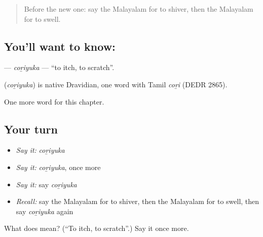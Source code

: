 \label{lesson:ML-C304-coriyuka}



\begin{quote}
Before the new one: say the Malayalam for to shiver, then the Malayalam for to swell.
\end{quote}

\subsection*{You'll want to know: }
\textbf{} — \emph{coṟiyuka} — \textquotedblleft{}to itch, to scratch\textquotedblright{}.

\begin{cousinweb}
\textbf{} (\emph{coṟiyuka}) is native Dravidian, one word with Tamil \emph{coṟi} (DEDR 2865).
\end{cousinweb}

\begin{grammarlens}[title={What you've built}]
One more word for this chapter.
\end{grammarlens}

\subsection*{Your turn}
\begin{itemize}
\raggedright
  \item \emph{Say it:} \emph{coṟiyuka}
  \item \emph{Say it:} \emph{coṟiyuka}, once more
  \item \emph{Say it:} say \emph{coṟiyuka}
  \item \emph{Recall:} say the Malayalam for to shiver, then the Malayalam for to swell, then say \emph{coṟiyuka} again
\end{itemize}

\begin{tcolorbox}[breakable,colback=teal!4,colframe=teal!35!black,title={Before you move on}]
What does  mean? (\textquotedblleft{}To itch, to scratch\textquotedblright{}.) Say it once more.
\end{tcolorbox}
